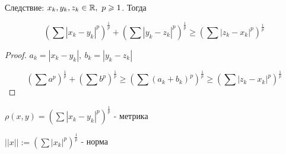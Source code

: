 \begin{theorem-non}
    Следствие: $x_k, y_k, z_k \in \mathbb{R},\ p \geqslant 1$. Тогда

    \[ \left( \sum |x_k-y_k|^p \right)^\frac{1}{p} + \left( \sum |y_k-z_k|^p \right)^\frac{1}{p} \geqslant
    \left( \sum |z_k-x_k|^p \right)^\frac{1}{p} \]
    
\end{theorem-non}

\begin{proof}
    $a_k = |x_k - y_k|,\ b_k = |y_k - z_k|$

    \[ \left( \sum a^p \right)^\frac{1}{p} + \left( \sum b^p \right)^\frac{1}{p} 
    \geqslant \left( \sum (a_k+b_k)^p \right)^\frac{1}{p} \geqslant \left( \sum |z_k-x_k|^p \right)^\frac{1}{p} \]
    
\end{proof}

\begin{notice}
$\rho(x, y) = \left( \sum |x_k-y_k|^p \right)^\frac{1}{p}$ - метрика

$||x|| := \left( \sum |x_k|^p \right)^\frac{1}{p}$ - норма
\end{notice}